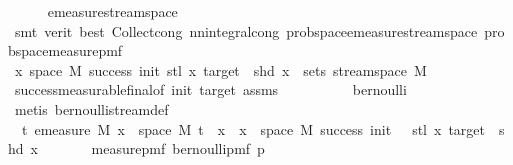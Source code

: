 \begin{isabellebody}
\ \ \ \ \isamarkupfalse%
\ emeasure{\isacharunderscore}{\kern0pt}stream{\isacharunderscore}{\kern0pt}space\isanewline
\ \ \ \ \isamarkupfalse%
\ {\isacharparenleft}{\kern0pt}smt\ {\isacharparenleft}{\kern0pt}verit{\isacharcomma}{\kern0pt}\ best{\isacharparenright}{\kern0pt}\ Collect{\isacharunderscore}{\kern0pt}cong\ nn{\isacharunderscore}{\kern0pt}integral{\isacharunderscore}{\kern0pt}cong\ prob{\isacharunderscore}{\kern0pt}space{\isachardot}{\kern0pt}emeasure{\isacharunderscore}{\kern0pt}stream{\isacharunderscore}{\kern0pt}space\ prob{\isacharunderscore}{\kern0pt}space{\isacharunderscore}{\kern0pt}measure{\isacharunderscore}{\kern0pt}pmf{\isacharparenright}{\kern0pt}\isanewline
\ \ \isamarkupfalse%
\ \isamarkupfalse%
\ {\isachardoublequoteopen}{\isacharbraceleft}{\kern0pt}x{\isasymin}\ space\ M{\isachardot}{\kern0pt}\ success\ {\isacharparenleft}{\kern0pt}init{\isacharplus}{\kern0pt}{}{\isacharparenright}{\kern0pt}\ {\isacharparenleft}{\kern0pt}stl\ x{\isacharparenright}{\kern0pt}\ target\ {\isasymand}\ shd\ x{\isacharbraceright}{\kern0pt}\ {\isasymin}\ sets\ {\isacharparenleft}{\kern0pt}stream{\isacharunderscore}{\kern0pt}space\ {\isacharquery}{\kern0pt}M{\isacharparenright}{\kern0pt}{\isachardoublequoteclose}\isanewline
\ \ \ \ \isamarkupfalse%
\ success{\isacharunderscore}{\kern0pt}measurable{\isacharunderscore}{\kern0pt}final{\isacharbrackleft}{\kern0pt}of\ init\ target{\isacharbrackright}{\kern0pt}\ assms\isanewline
\ \ \ \ \ \ \ \ \ \ bernoulli\isanewline
\ \ \ \ \isamarkupfalse%
\ {\isacharparenleft}{\kern0pt}metis\ bernoulli{\isacharunderscore}{\kern0pt}stream{\isacharunderscore}{\kern0pt}def{\isacharparenright}{\kern0pt}\ \ \ \ \isanewline
\ \ \isamarkupfalse%
\ \isamarkupfalse%
\ {\isachardoublequoteopen}{\isasymintegral}\isactrlsup {\isacharplus}{\kern0pt}\ t{\isachardot}{\kern0pt}\ emeasure\ M\ {\isacharbraceleft}{\kern0pt}x\ {\isasymin}\ space\ M{\isachardot}{\kern0pt}\ t\ {\isacharhash}{\kern0pt}{\isacharhash}{\kern0pt}\ x\ {\isasymin}\ {\isacharbraceleft}{\kern0pt}x\ {\isasymin}\ space\ M{\isachardot}{\kern0pt}\ success\ {\isacharparenleft}{\kern0pt}init\ {\isacharplus}{\kern0pt}\ {}{\isacharparenright}{\kern0pt}\ {\isacharparenleft}{\kern0pt}stl\ x{\isacharparenright}{\kern0pt}\ target\ {\isasymand}\ shd\ x{\isacharbraceright}{\kern0pt}{\isacharbraceright}{\kern0pt}\isanewline
\ \ \ \ \ \ \ {\isasympartial}measure{\isacharunderscore}{\kern0pt}pmf\ {\isacharparenleft}{\kern0pt}bernoulli{\isacharunderscore}{\kern0pt}pmf\ p{\isacharparenright}{\kern0pt}\ {\isacharequal}{\kern0pt}\isanewline

\end{isabellebody}
